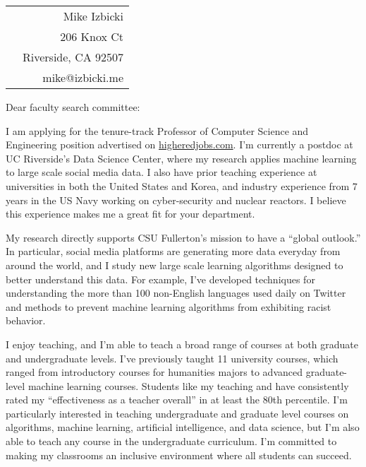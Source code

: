 \documentclass[12pt]{article}
\begin{document}
\noindent
\hspace{-0.13in}
\begin{tabularx}{1.03\textwidth}{Xr}
 & Mike Izbicki \\
 & 206 Knox Ct\\
 & Riverside, CA 92507\\
 & mike@izbicki.me\\
\end{tabularx}

\vspace{0.25in}

\setlength{\parskip}{15pt plus4mm minus3mm}

\noindent
Dear faculty search committee:

\noindent
I am applying for the tenure-track Professor of Computer Science and Engineering position advertised on \url{higheredjobs.com}.
I'm currently a postdoc at UC Riverside's Data Science Center,
where my research applies machine learning to large scale social media data.
I also have prior teaching experience at universities in both the United States and Korea, and
industry experience from 7 years in the US Navy working on cyber-security and nuclear reactors.
I believe this experience makes me a great fit for your department.

\noindent
My research directly supports CSU Fullerton's mission to have a ``global outlook.''
In particular, social media platforms are generating more data everyday from around the world,
and I study new large scale learning algorithms designed to better understand this data.
For example, I've developed techniques for understanding the more than 100 non-English languages used daily on Twitter and methods to prevent machine learning algorithms from exhibiting racist behavior.

\noindent
I enjoy teaching,
and I'm able to teach a broad range of courses at both graduate and undergraduate levels.
I've previously taught 11 university courses,
which ranged from introductory courses for humanities majors to advanced graduate-level machine learning courses.
Students like my teaching and have consistently rated my ``effectiveness as a teacher overall'' in at least the 80th percentile.
I'm particularly interested in teaching undergraduate and graduate level courses on algorithms, machine learning, artificial intelligence, and data science,
but I'm also able to teach any course in the undergraduate curriculum.
I'm committed to making my classrooms an inclusive environment where all students can succeed.
\end{document}
